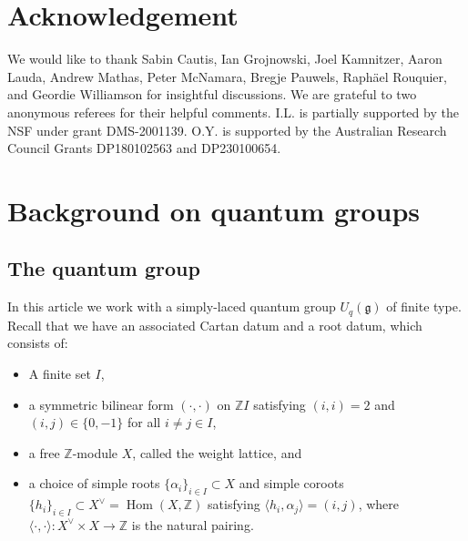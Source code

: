 \documentclass[11pt,reqno]{amsart}
\numberwithin{equation}{section}
\theoremstyle{definition}
\theoremstyle{named}
\newcommand{\fg}{\mathfrak{g}}
\newcommand{\ZZ}{\mathbb{Z}}
\newcommand{\Hom}{\operatorname{Hom}}
\begin{document}
\section*{Acknowledgement}
We would like to thank Sabin Cautis, Ian Grojnowski, Joel Kamnitzer,  Aaron Lauda, Andrew Mathas, Peter McNamara, Bregje Pauwels, Raph\"ael Rouquier, and Geordie Williamson  for insightful discussions.  We are grateful to two anonymous referees for their helpful comments.
I.L. is partially supported by the NSF under grant DMS-2001139.
O.Y. is supported by the Australian Research Council Grants DP180102563 and DP230100654.

\section{Background on quantum groups}
\subsection{The quantum group} In this article we work with a  simply-laced quantum group $U_q(\fg)$ of finite type.  Recall that we have an associated Cartan datum and a root datum, which consists of:
\begin{itemize}
\item A finite set $I$,
\item a symmetric bilinear form $(\cdot,\cdot)$ on $\ZZ I$ satisfying $(i,i)=2$ and $(i,j)\in \{0,-1\}$ for all $i \neq j \in I$,
\item a free $\ZZ$-module $X$, called the weight lattice, and
\item a choice of simple roots $\{ \alpha_i \}_{i\in I} \subset X$ and simple coroots $\{ h_i \}_{i\in I} \subset X^\vee=\Hom(X,\ZZ)$ satisfying $\langle h_i,\alpha_j\rangle=(i,j)$, where $\langle \cdot,\cdot\rangle:X^\vee \times X \to \ZZ$ is the natural pairing.  
\end{itemize}
\end{document}
